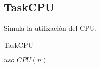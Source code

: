 \subsection{TaskCPU}

Simula la utilizaci\'on del CPU.

\begin{algorithm}
 \caption{TaskCPU}
 \begin{algorithmic}[1]
   \State $uso\_CPU(n)$ 
 \EndProcedure
 \end{algorithmic}
\end{algorithm}

